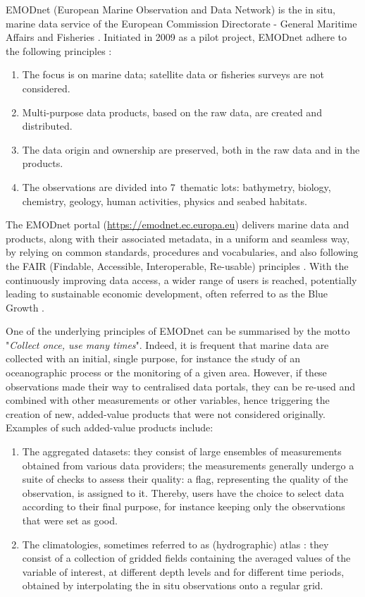 \documentclass[essd,manuscript]{copernicus}
\begin{document}

EMODnet (European Marine Observation and Data Network) is the in situ, marine data service of the European Commission Directorate - General Maritime Affairs and Fisheries \citep{MartinMiguez2019}. Initiated in 2009 as a pilot project, EMODnet adhere to the following principles \citep{Shepherd2018}: 
\begin{enumerate}
\item The focus is on marine data; satellite data or fisheries surveys are not considered. 
\item Multi-purpose data products, based on the raw data, are created and distributed. 
\item The data origin and ownership are preserved, both in the raw data and in the products. 
\item The observations are divided into 7~thematic lots: bathymetry, biology, chemistry, geology, human activities, physics and seabed habitats. 
\end{enumerate} 

The EMODnet portal (\url{https://emodnet.ec.europa.eu}) delivers marine data and products, along with their associated metadata, in a uniform and seamless way, by relying on common standards, procedures and vocabularies, and also following the FAIR (Findable, Accessible, Interoperable, Re-usable) principles \citep {Wilkinson2016,Wilkinson2019}. With the continuously improving data access, a wider range of users is reached, potentially leading to sustainable economic development, often referred to as the Blue Growth \citep{Commission2012}. 

One of the underlying principles of EMODnet can be summarised by the motto "\textit{Collect once, use many times}". Indeed, it is frequent that marine data are collected with an initial, single purpose, for instance the study of an oceanographic process or the monitoring of a given area. However, if these observations made their way to centralised data portals, they can be re-used and combined with other measurements or other variables, hence triggering the creation of new, added-value products that were not considered originally. Examples of such added-value products include:
\begin{enumerate}
\item The aggregated datasets: they consist of large ensembles of measurements obtained from various data providers; the measurements generally undergo a suite of checks to assess their quality: a flag, representing the quality of the observation, is assigned to it. Thereby, users have the choice to select data according to their final purpose, for instance keeping only the observations that were set as good.
\item The climatologies, sometimes referred to as (hydrographic) atlas \citep[e.g.][]{soton16209,Iona_2018}: they consist of a collection of gridded fields containing the averaged values of the variable of interest, at different depth levels and for different time periods, obtained by interpolating the in situ observations onto a regular grid.
\end{enumerate}
\end{document}
